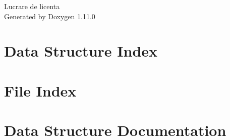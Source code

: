 \documentclass[twoside]{book}
\newcommand{\+}{\discretionary{\mbox{\scriptsize$\hookleftarrow$}}{}{}}
\newcommand{\clearemptydoublepage}{%
    \newpage{\pagestyle{empty}\cleardoublepage}%
  }
\begin{document}
  \raggedbottom
  \begin{titlepage}
  \vspace*{7cm}
  \begin{center}%
  {\Large Lucrare de licenta}\\
  \vspace*{1cm}
  {\large Generated by Doxygen 1.11.0}\\
  \end{center}
  \end{titlepage}
  \clearemptydoublepage
  \tableofcontents
  \clearemptydoublepage

\chapter{Data Structure Index}

\chapter{File Index}

\chapter{Data Structure Documentation}











\end{document}
